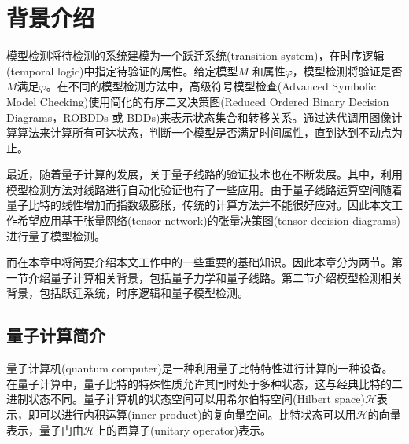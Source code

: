 \chapter{背景介绍}

模型检测将待检测的系统建模为一个跃迁系统(transition system)，在时序逻辑(temporal logic)中指定待验证的属性。给定模型\(M\) 和属性\(\varphi\)，模型检测将验证是否\(M\)满足\(\varphi\)。在不同的模型检测方法中，高级符号模型检查(Advanced Symbolic Model Checking)\citep{Grobelna_2015}使用简化的有序二叉决策图(Reduced Ordered Binary Decision Diagrams，ROBDDs 或 BDDs)\citep{Bryant_1986}来表示状态集合和转移关系。通过迭代调用图像计算算法来计算所有可达状态，判断一个模型是否满足时间属性，直到达到不动点为止。

最近，随着量子计算的发展，关于量子线路的验证技术也在不断发展\citep{viamontes2007checking,burgholzer2020advanced}。其中，利用模型检测方法对线路进行自动化验证也有了一些应用。由于量子线路运算空间随着量子比特的线性增加而指数级膨胀，传统的计算方法并不能很好应对。因此本文工作希望应用基于张量网络(tensor network)的张量决策图(tensor decision diagrams)进行量子模型检测。

而在本章中将简要介绍本文工作中的一些重要的基础知识。因此本章分为两节。第一节介绍量子计算相关背景，包括量子力学和量子线路。第二节介绍模型检测相关背景，包括跃迁系统，时序逻辑和量子模型检测。
\section{量子计算简介}
量子计算机(quantum computer)是一种利用量子比特特性进行计算的一种设备。在量子计算中，量子比特的特殊性质允许其同时处于多种状态，这与经典比特的二进制状态不同。量子计算机的状态空间可以用希尔伯特空间(Hilbert space)\(\mathcal{H}\)表示\citep{nielsen2010quantum}，即可以进行内积运算(inner product)的复向量空间。比特状态可以用\(\mathcal{H}\)的向量表示，量子门由\(\mathcal{H}\)上的酉算子(unitary operator)表示。

